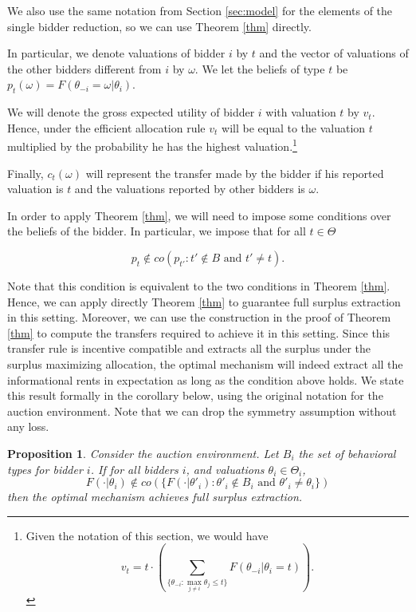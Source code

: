 \documentclass[12pt]{article}
\newtheorem{proposition}{Proposition}
\begin{document}
We also use the same notation from Section \ref{sec:model} for the elements of the single bidder reduction, so we can use Theorem \ref{thm} directly. 

In particular, we denote valuations of bidder $i$ by $t$ and the vector of valuations of the other bidders different from $i$ by $\omega$. We let the beliefs of type $t$ be $p_t(\omega)=F(\theta_{-i}=\omega|\theta_i)$.

We will denote the gross expected utility of bidder $i$ with valuation $t$ by $v_t$. Hence, under the efficient allocation rule $v_t$ will be equal to the valuation $t$ multiplied by the probability he has the highest valuation.\footnote{Given the notation of this section, we would have \[
		v_t=t\cdot\left(\sum_{\{\theta_{-i}:\max_{j\neq i}\theta_j\leq t\}} F(\theta_{-i}|\theta_i=t)\right).
	\]}

Finally, $c_t(\omega)$ will represent the transfer made by the bidder if his reported valuation is $t$ and the valuations reported by other bidders is $\omega$.

In order to apply Theorem \ref{thm}, we will need to impose some conditions over the beliefs of the bidder. In particular, we impose that for all $t\in \Theta$

	\[
		p_t\not\in co(p_{t'}:t'\not\in B \mbox{ and }t'\neq t).
	\] 

Note that this condition is equivalent to the two conditions in Theorem \ref{thm}. Hence, we can apply directly Theorem \ref{thm} to guarantee full surplus extraction in this setting. Moreover, we can use the construction in the proof of Theorem \ref{thm} to compute the transfers required to achieve it in this setting. Since this transfer rule is incentive compatible and extracts all the surplus under the surplus maximizing allocation, the optimal mechanism will indeed extract all the informational rents in expectation as long as the condition above holds. We state this result formally in the corollary below, using the original notation for the auction environment. Note that we can drop the symmetry assumption without any loss.

	\begin{proposition}
		Consider the auction environment. Let $B_i$ the set of behavioral types for bidder $i$. If for all bidders $i$, and valuations $\theta_i\in \Theta_i$, 
			\[
				F(\cdot|\theta_i) \not\in co(\{F(\cdot|\theta'_i):\theta'_i\not\in B_i \mbox{ and }\theta'_i\neq \theta_i\})
			\] 
			then the optimal mechanism achieves full surplus extraction.
	\end{proposition}
\end{document}

